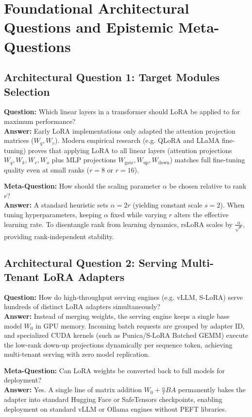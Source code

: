 \documentclass[11pt,a4paper]{article}
\theoremstyle{definition}
\begin{document}
\section{Foundational Architectural Questions and Epistemic Meta-Questions}

\subsection{Architectural Question 1: Target Modules Selection}
\textbf{Question:} Which linear layers in a transformer should LoRA be applied to for maximum performance?\\
\textbf{Answer:} Early LoRA implementations only adapted the attention projection matrices ($W_q, W_v$). Modern empirical research (e.g. QLoRA and LLaMA fine-tuning) proves that applying LoRA to all linear layers (attention projections $W_q, W_k, W_v, W_o$ plus MLP projections $W_{\text{gate}}, W_{\text{up}}, W_{\text{down}}$) matches full fine-tuning quality even at small ranks ($r = 8$ or $r = 16$).

\textbf{Meta-Question:} How should the scaling parameter $\alpha$ be chosen relative to rank $r$?\\
\textbf{Answer:} A standard heuristic sets $\alpha = 2r$ (yielding constant scale $s = 2$). When tuning hyperparameters, keeping $\alpha$ fixed while varying $r$ alters the effective learning rate. To disentangle rank from learning dynamics, rsLoRA scales by $\frac{\alpha}{\sqrt{r}}$, providing rank-independent stability.

\subsection{Architectural Question 2: Serving Multi-Tenant LoRA Adapters}
\textbf{Question:} How do high-throughput serving engines (e.g. vLLM, S-LoRA) serve hundreds of distinct LoRA adapters simultaneously?\\
\textbf{Answer:} Instead of merging weights, the serving engine keeps a single base model $W_0$ in GPU memory. Incoming batch requests are grouped by adapter ID, and specialized CUDA kernels (such as Punica/S-LoRA Batched GEMM) execute the low-rank down-up projections dynamically per sequence token, achieving multi-tenant serving with zero model replication.

\textbf{Meta-Question:} Can LoRA weights be converted back to full models for deployment?\\
\textbf{Answer:} Yes. A single line of matrix addition $W_0 + \frac{\alpha}{r}BA$ permanently bakes the adapter into standard Hugging Face or SafeTensors checkpoints, enabling deployment on standard vLLM or Ollama engines without PEFT libraries.
\end{document}
